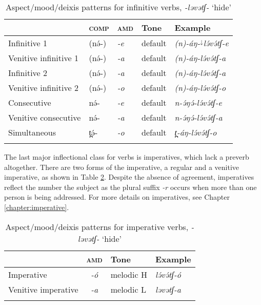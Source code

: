 \begin{table}
\begin{tabular}[t]{lllll}
\lsptoprule
						& \textsc{comp} &  \textsc{amd}  		& Tone 			& Example \\
\midrule
Infinitive 1 	& (nə́-) & \textit{-e} 	& default 	& \textit{(n)-áŋ-$^{\downarrow}$lə́və́tʃ-e}  \\
Venitive infinitive 1  	& (nə́-) & \textit{-a} 	& default 	& \textit{(n)-áŋ-\super{$\downarrow$}lə́və́tʃ-a} \\
Infinitive 2  	& (nə́-) & \textit{-a} 	& default	& \textit{(n)-áŋ-\super{$\downarrow$}lə́və́tʃ-a} \\
Venitive infinitive 2  	& (nə́-) & \textit{-o} 	& default	& \textit{(n)-áŋ-\super{$\downarrow$}lə́və́tʃ-o} \\
Consecutive  & nə́- & \textit{-e} & default & \textit{n-ə́ŋə́-\super{$\downarrow$}lə́və́tʃ-e} \\
Venitive consecutive   & nə́- & \textit{-a} & default & \textit{n-ə́ŋə́-\super{$\downarrow$}lə́və́tʃ-a} \\
Simultaneous & t̪ə́- & \textit{-o} & default		& \textit{t̪-áŋ-\super{$\downarrow$}lə́və́tʃ-o} \\
\lspbottomrule
\end{tabular}	
\caption{Aspect/mood/deixis patterns for infinitive verbs, \textit{-ləvətʃ-} `hide'}
\label{tab:ch11:2}
\end{table}

The last major inflectional class for verbs is imperatives, which lack a preverb altogether. There are two forms of the imperative, a regular and a venitive imperative, as shown in Table \ref{tab:ch11:3}. Despite the absence of agreement, imperatives reflect the number the subject as the plural suffix \textit{-r} occurs when more than one person is being addressed. For more details on imperatives, see Chapter \ref{chapter:imperative}.

\begin{table}
\begin{tabular}[t]{lcll}
\lsptoprule
						&  \textsc{amd}  		& Tone 			& Example \\
\midrule
Imperative 	& \textit{-ó} & melodic H 	& \textit{lə́və́tʃ-ó} \\	
Venitive imperative 	& \textit{-a} 	& melodic L		& \textit{ləvətʃ-a} \\
\lspbottomrule
\end{tabular}	
\caption{Aspect/mood/deixis patterns for imperative verbs, \textit{-ləvətʃ-} `hide'}
\label{tab:ch11:3}
\end{table}

